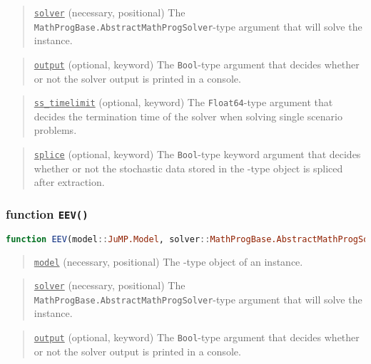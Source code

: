 \begin{quote}
	\noindent\underline{\texttt{solver}} (necessary, positional) The \texttt{MathProgBase.AbstractMathProgSolver}-type argument that will solve the instance.
\end{quote}

\begin{quote}
	\noindent\underline{\texttt{output}} (optional, keyword) The \texttt{Bool}-type argument that decides whether or not the solver output is printed in a console.
\end{quote}

\begin{quote}
	\noindent\underline{\texttt{ss\_timelimit}} (optional, keyword) The \texttt{Float64}-type argument that decides the termination time of the solver when solving single scenario problems.
\end{quote}

\begin{quote}
	\noindent\underline{\texttt{splice}} (optional, keyword) The \texttt{Bool}-type keyword argument that decides whether or not the stochastic data stored in the \jumpmodel-type object is spliced after extraction.
\end{quote}

\subsubsection{function \texttt{EEV()}}
\begin{lstlisting}[frame=single,language=julia]
function EEV(model::JuMP.Model, solver::MathProgBase.AbstractMathProgSolver; output::Bool=false, ev_timelimit::Float64=Inf, eev_timelimit::Float64=Inf, genericnames::Bool=true)
\end{lstlisting}

\begin{quote}
	\noindent\underline{\texttt{model}} (necessary, positional) The \jumpmodel-type object of an instance.
\end{quote}

\begin{quote}
	\noindent\underline{\texttt{solver}} (necessary, positional) The \texttt{MathProgBase.AbstractMathProgSolver}-type argument that will solve the instance.
\end{quote}

\begin{quote}
	\noindent\underline{\texttt{output}} (optional, keyword) The \texttt{Bool}-type argument that decides whether or not the solver output is printed in a console.
\end{quote}

